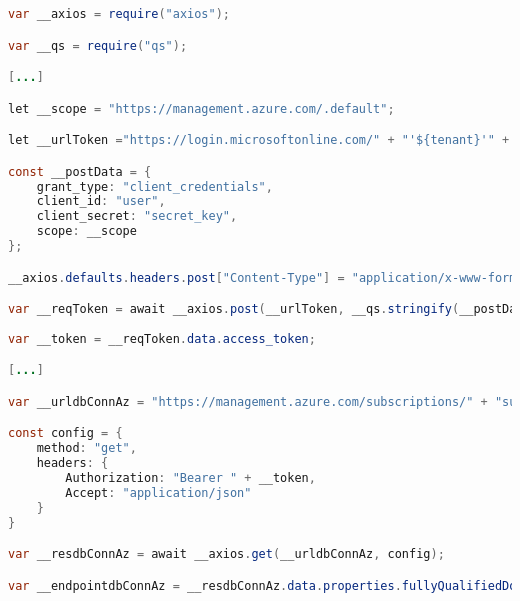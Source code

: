 \begin{lstlisting}[language=Java,caption={Codice JavaScript generato per la variabile di tipo sql su ambiente Azure per ottenere l'endpoint del database.}, label={lst:azureDbJs}]
var __axios = require("axios");

var __qs = require("qs");

[...]

let __scope = "https://management.azure.com/.default";

let __urlToken ="https://login.microsoftonline.com/" + "'${tenant}'" + "/oauth2/v2.0/token";

const __postData = {
    grant_type: "client_credentials",
    client_id: "user",
    client_secret: "secret_key",
    scope: __scope
};

__axios.defaults.headers.post["Content-Type"] = "application/x-www-form-urlencoded";

var __reqToken = await __axios.post(__urlToken, __qs.stringify(__postData));
    
var __token = __reqToken.data.access_token;

[...]

var __urldbConnAz = "https://management.azure.com/subscriptions/" + "subscription_id" + "/resourceGroups/" + "nomeResourceGroup" + "/providers/Microsoft.DBforMySQL/servers/" + "nomeIstanza" + "?api-version=2017-12-01"

const config = {
    method: "get",
    headers: {
        Authorization: "Bearer " + __token,
        Accept: "application/json"
    }
}

var __resdbConnAz = await __axios.get(__urldbConnAz, config);

var __endpointdbConnAz = __resdbConnAz.data.properties.fullyQualifiedDomainName;

\end{lstlisting}

